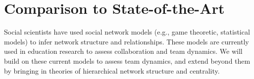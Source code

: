 \section{Comparison to State-of-the-Art}
\label{sec:related}
Social scientists have used social network models (e.g., game theoretic,
statistical models) to infer network structure and relationships. These models
are currently used in education research to assess collaboration and team
dynamics. We will build on these current models to assess team dynamics, and
extend beyond them by bringing in theories of hierarchical network structure and
centrality.
